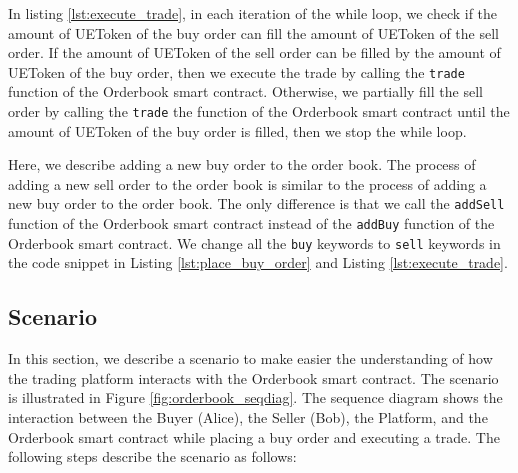 In listing \ref{lst:execute_trade}, in each iteration of the while loop, we check if the amount of UEToken of the buy order can fill the amount of UEToken of the sell order. If the amount of UEToken of the sell order can be filled by the amount of UEToken of the buy order, then we execute the
trade by calling the \texttt{trade} function of the Orderbook smart contract. Otherwise, we partially fill the sell order by calling the \texttt{trade}
the function of the Orderbook smart contract until the amount of UEToken of the buy order is filled, then we stop the while loop.


Here, we describe adding a new buy order to the order book. The process of adding a new sell order to the order book is similar to the
process of adding a new buy order to the order book. The only difference is that we call the \texttt{addSell} function of the Orderbook smart contract
instead of the \texttt{addBuy} function of the Orderbook smart contract. We change all the \texttt{buy} keywords to \texttt{sell} keywords in the code
snippet in Listing \ref{lst:place_buy_order} and Listing \ref{lst:execute_trade}.


\subsection{Scenario}

In this section, we describe a scenario to make easier the understanding of how the trading platform interacts with the Orderbook smart contract. The scenario is illustrated in Figure
\ref{fig:orderbook_seqdiag}. The sequence diagram shows the interaction between the Buyer (Alice), the Seller (Bob), the Platform, and
the Orderbook smart contract while placing a buy order and executing a trade. The following steps describe the scenario as follows:



